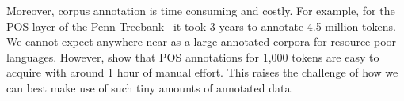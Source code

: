 \documentclass[12pt,twoside,final,hidelinks]{ltthesis}
\theoremstyle{definition}
\begin{document}
Moreover, corpus annotation is time consuming and costly. For example, for the POS layer of the Penn Treebank~\cite{PenTreeBank} it took 3 years to annotate 4.5 million tokens. We cannot expect anywhere near as a large annotated corpora for resource-poor languages. However,  show that POS annotations for 1,000 tokens are easy to acquire with around 1 hour of manual effort. This raises the challenge of how we can best make use of such tiny amounts of annotated data. %
\end{document}
